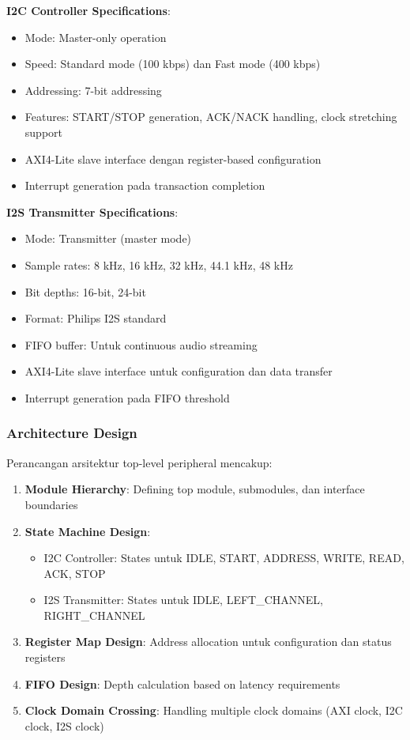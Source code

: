 \textbf{I2C Controller Specifications}:
\begin{itemize}
	\item Mode: Master-only operation
	\item Speed: Standard mode (100 kbps) dan Fast mode (400 kbps)
	\item Addressing: 7-bit addressing
	\item Features: START/STOP generation, ACK/NACK handling, clock stretching support
	\item AXI4-Lite slave interface dengan register-based configuration
	\item Interrupt generation pada transaction completion
\end{itemize}

\textbf{I2S Transmitter Specifications}:
\begin{itemize}
	\item Mode: Transmitter (master mode)
	\item Sample rates: 8 kHz, 16 kHz, 32 kHz, 44.1 kHz, 48 kHz
	\item Bit depths: 16-bit, 24-bit
	\item Format: Philips I2S standard
	\item FIFO buffer: Untuk continuous audio streaming
	\item AXI4-Lite slave interface untuk configuration dan data transfer
	\item Interrupt generation pada FIFO threshold
\end{itemize}

\subsubsection{Architecture Design}

Perancangan arsitektur top-level peripheral mencakup:
\begin{enumerate}
	\item \textbf{Module Hierarchy}: Defining top module, submodules, dan interface boundaries
	\item \textbf{State Machine Design}: 
	\begin{itemize}
		\item I2C Controller: States untuk IDLE, START, ADDRESS, WRITE, READ, ACK, STOP
		\item I2S Transmitter: States untuk IDLE, LEFT\_CHANNEL, RIGHT\_CHANNEL
	\end{itemize}
	\item \textbf{Register Map Design}: Address allocation untuk configuration dan status registers
	\item \textbf{FIFO Design}: Depth calculation based on latency requirements
	\item \textbf{Clock Domain Crossing}: Handling multiple clock domains (AXI clock, I2C clock, I2S clock)
\end{enumerate}

